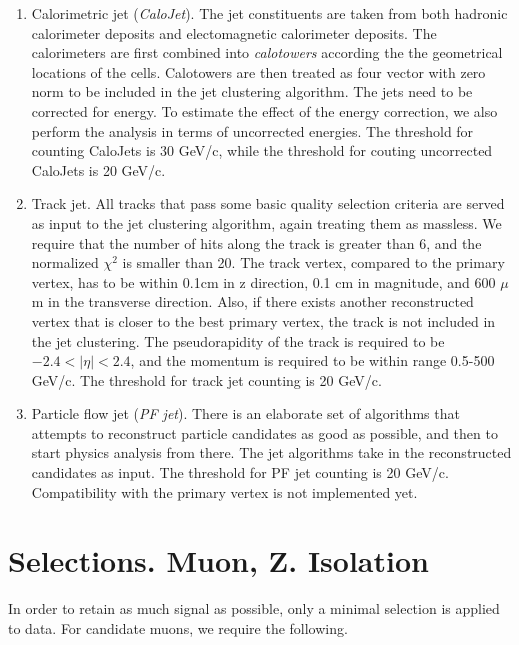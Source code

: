 \documentclass[10pt,a4paper,onecolumn]{	article}
\begin{document}
\begin{enumerate}
\item Calorimetric jet (\emph{CaloJet}).  The jet constituents are taken from both hadronic calorimeter deposits and electomagnetic calorimeter deposits.
   The calorimeters are first combined into \emph{calotowers} according the the geometrical locations of the cells.
   Calotowers are then treated as four vector with zero norm to be included in the jet clustering algorithm.
   The jets need to be corrected for energy.  To estimate the effect of the energy correction, we also perform the analysis in terms of uncorrected energies.
   The threshold for counting CaloJets is 30 GeV/c, while the threshold for couting uncorrected CaloJets is 20 GeV/c.
\item Track jet.  All tracks that pass some basic quality selection criteria are served as input to the jet clustering algorithm, again treating them as massless.
   We require that the number of hits along the track is greater than 6, and the normalized $\chi^2$ is smaller than 20.
   The track vertex, compared to the primary vertex, has to be within 0.1cm in z direction, 0.1 cm in magnitude, and 600 $\mu$m in the transverse direction.
   Also, if there exists another reconstructed vertex that is closer to the best primary vertex, the track is not included in the jet clustering.
   The pseudorapidity of the track is required to be $-2.4 < |\eta| < 2.4$, and the momentum is required to be within range 0.5-500 GeV/c.
   The threshold for track jet counting is 20 GeV/c.
\item Particle flow jet (\emph{PF jet}).  There is an elaborate set of algorithms that attempts to reconstruct particle candidates as good as possible,
   and then to start physics analysis from there.  The jet algorithms take in the reconstructed candidates as input.
   The threshold for PF jet counting is 20 GeV/c.  Compatibility with the primary vertex is not implemented yet.
\end{enumerate}

\section{Selections.  Muon, Z.  Isolation}

In order to retain as much signal as possible, only a minimal selection is applied to data.
For candidate muons, we require the following.
\end{document}
